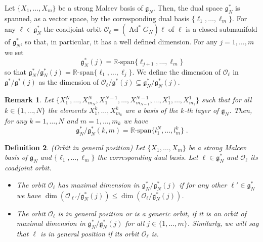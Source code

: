 \documentclass[pdflatex,sn-mathphys-num]{sn-jnl}
\theoremstyle{thmstyletwo}
\newtheorem{definition}{Definition}[section]
\theoremstyle{thmstyleone}
\theoremstyle{thmstyletwo}
\newtheorem{remark}[definition]{Remark}
\newcommand{\fancyg}{\mathfrak{g}}
\newcommand{\coadjoint}{\operatorname{Ad}^*}
\newcommand{\R}{\mathbb{R}}
\begin{document}
	Let $\{X_1, \ldots, X_m\}$ be a strong Malcev basis of $\fancyg_N$. Then, the dual space $\fancyg_N^*$ is spanned, as a vector space, by the corresponding dual basis $\{\ell_1, \ldots, \ell_m\}$. For any $\ell \in \fancyg_N^*$ the coadjoint orbit $\mathcal{O}_\ell = (\coadjoint G_N)\ell$ of $\ell$ is a closed submanifold of $\fancyg_N^*$, so that, in particular, it has a well defined dimension. For any $j = 1, \ldots,m$ we set
	\begin{equation*}
		\fancyg_N^*(j)=\mathbb{R}\text{-span}\{\ell_{j+1}, \ldots, \ell_m\}
	\end{equation*}
	so that $\fancyg_N^*/\fancyg_N^*(j) = \mathbb{R}$-span$\{\ell_1, \ldots, \ell_j\}$. We define the dimension of $\mathcal{O}_\ell$ in $\fancyg^*/\fancyg^*(j)$ as the dimension of $\mathcal{O}_\ell/\fancyg^*(j)\subseteq \fancyg_N^*/\fancyg_N^*(j)$.
	\begin{remark}
		Let $\{X_1^N, \ldots, X_{m_N}^N, X_1^{N-1}, \ldots, X_{m_{N-1}}^{N-1}, \ldots, X_1^1, \ldots, X_{m_1}^1\}$ such that for all $k \in \{1, \ldots, N\}$ the elements $X_1^k, \ldots, X_{m_k}^k$ are a basis of the $k$-th layer of $\fancyg_N$. Then, for any $k = 1, \ldots, N$ and $m = 1, \ldots, m_k$ we have
        \[\fancyg_N^*/\fancyg_{N}^*(k, m) = \R\text{-span}\{l_1^N, \ldots, l_m^k\} \;.\]
	\end{remark}
	\begin{definition}{(Orbit in general position)}
		Let $\{X_1, \ldots, X_m\}$ be a strong Malcev basis of $\fancyg_N$ and $\{\ell_1, \ldots, \ell_m\}$ the corresponding dual basis. Let $\ell \in \fancyg_N^*$ and $\mathcal{O}_\ell$ its coadjoint orbit. 
		\begin{itemize}[leftmargin=2em]
			\item[i)]  The orbit $\mathcal{O}_\ell$ has maximal dimension in $\fancyg_N^*/\fancyg_N^*(j)$ if for any other $\ell' \in \fancyg_N^*$ we have $\operatorname{dim}(\mathcal{O}_{\ell'}/\fancyg_N^*(j)) \leq \operatorname{dim}(\mathcal{O}_\ell/\fancyg_N^*(j))$.\\
			\item[ii)] 	The orbit $\mathcal{O}_\ell$ is in \textit{general position} or is a \textit{generic orbit}, if it is an orbit of maximal dimension in $\fancyg_N^*/\fancyg_N^*(j)$ for all $j \in \{1,\ldots, m\}$. Similarly, we will say that $\ell$ is in general position if its orbit $\mathcal{O}_\ell$ is.
		\end{itemize}
	\end{definition}
\end{document}
